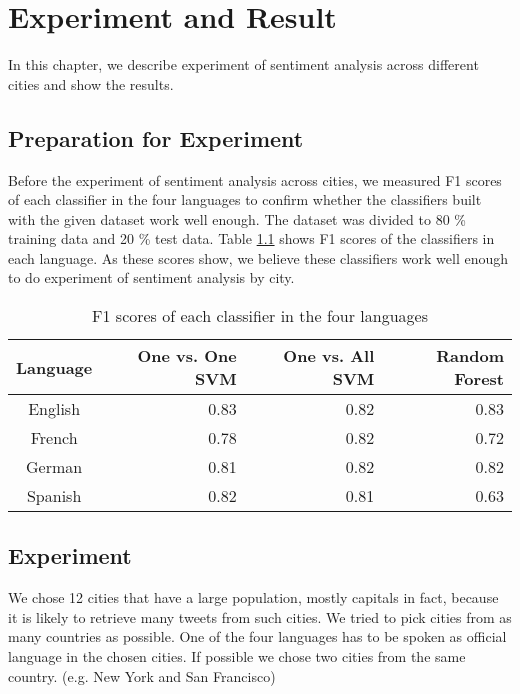 \chapter{Experiment and Result}
In this chapter, we describe experiment of sentiment analysis across different cities and show the results.
\section{Preparation for Experiment}
Before the experiment of sentiment analysis across cities, we measured F1 scores of each classifier in the four languages to confirm whether the classifiers built with the given dataset work well enough.
The dataset was divided to 80 \% training data and 20 \% test data.
Table \ref{tab:f1score} shows F1 scores of the classifiers in each language.
As these scores show, we believe these classifiers work well enough to do experiment of sentiment analysis by city.


\begin{table}[ht]
	\caption{F1 scores of each classifier in the four languages}
	\begin{tabular}{|c|r|r|r|} \hline
	Language&One vs. One SVM &One vs. All SVM &Random Forest\\ \hline \hline
	English & 0.83 & 0.82 & 0.83  \\ \hline
	French & 0.78 & 0.82 & 0.72  \\ \hline
	German & 0.81 & 0.82 & 0.82 \\ \hline
	Spanish & 0.82 & 0.81 & 0.63  \\ \hline
	\end{tabular}
	\label{tab:f1score}
\end{table}

\section{Experiment}

We chose 12 cities that have a large population, mostly capitals in fact, because it is likely to retrieve many tweets from such cities.
We tried to pick cities from as many countries as possible.
One of the four languages has to be spoken as official language in the chosen cities.
If possible we chose two cities from the same country. (e.g. New York and San Francisco)

